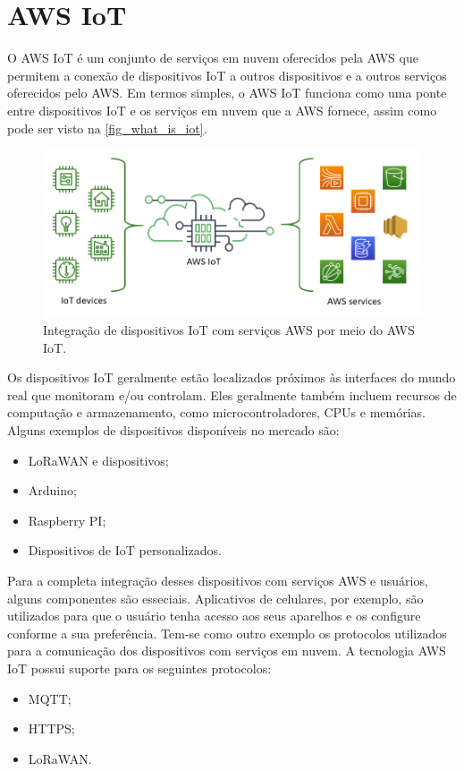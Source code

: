 \section{AWS IoT}

O AWS IoT é um conjunto de serviços em nuvem oferecidos pela AWS que permitem a conexão de dispositivos IoT a outros dispositivos e a outros serviços oferecidos pelo AWS. Em termos simples, o AWS IoT funciona como uma ponte entre dispositivos IoT e os serviços em nuvem que a AWS fornece, assim como pode ser visto na \autoref{fig_what_is_iot}.

\begin{figure}[htb]\label{fig_what_is_iot}
	\caption{Integração de dispositivos IoT com serviços AWS por meio do AWS IoT.}
	\begin{center}
		\includegraphics[scale=0.5]{Imagens/what-is-aws-iot.png}
	\end{center}
\end{figure}

Os dispositivos IoT geralmente estão localizados próximos às interfaces do mundo real que monitoram e/ou controlam. Eles geralmente também incluem recursos de computação e armazenamento, como microcontroladores, CPUs e memórias. Alguns exemplos de dispositivos disponíveis no mercado são:
\begin{itemize}
	\item LoRaWAN e dispositivos;
	\item Arduino;
	\item Raspberry PI;
	\item Dispositivos de IoT personalizados.
\end{itemize}

Para a completa integração desses dispositivos com serviços AWS e usuários, alguns componentes são esseciais. Aplicativos de celulares, por exemplo, são utilizados para que o usuário tenha acesso aos seus aparelhos e os configure conforme a sua preferência. Tem-se como outro exemplo os protocolos utilizados para a comunicação dos dispositivos com serviços em nuvem. A tecnologia AWS IoT possui suporte para os seguintes protocolos:
\begin{itemize}
	\item MQTT;
	\item HTTPS;
	\item LoRaWAN.
\end{itemize}

